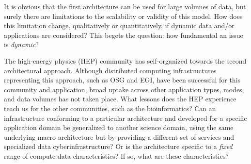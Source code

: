 It is obvious that the first architecture can be used for large
volumes of data, but surely there are limitations to the scalability
or validity of this model. How does this limitation change,
qualitatively or quantitatively, if dynamic data and/or applications
are considered? This begets the question: how fundamental an issue is
{\it dynamic}?

The high-energy physics (HEP) community has self-organized towards the
second architectural approach.  Although distributed computing
infrastructures representing this approach, such as OSG and EGI, have
been successful for this community and application, broad uptake
across other application types, modes, and data volumes has not taken
place. What lessons does the HEP experience teach us for the other
communities, such as the bioinformatics?  Can an infrastructure
conforming to a particular architecture and developed for a specific
application domain be generalized to another science domain, using the
same underlying macro architecture but by providing a different set of
services and specialized data cyberinfrastructure? Or is the
architecture specific to a {\it fixed} range of compute-data
characteristics? If so, what are these characteristics?


%
%


